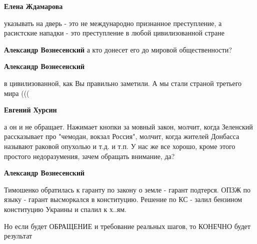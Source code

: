 \begin{itemize}
\begin{itemize}
 
\textbf{Елена Ждамарова} 

указывать на дверь - это не международно признанное преступление, а расистские
нападки - это преступление в любой цивилизованной стране


\textbf{Александр Вознесенский} а кто донесет его до мировой общественности?

 
\textbf{Александр Вознесенский} 

в цивилизованной, как Вы правильно заметили. А мы стали страной третьего мира (((

 
\textbf{Евгений Хурсин} 

а он и не обращает. Нажимает кнопки за мовный закон, молчит, когда Зеленский
рассказывает про "чемодан, вокзал Россия", молчит, когда жителей Донбасса
называют раковой опухолью и т.д. и т.п. У нас же все хорошо, кроме этого
простого недоразумения, зачем обращать внимание, да?


 
\textbf{Александр Вознесенский} 

Тимошенко обратилась к гаранту по закону о земле - гарант подтерся. ОПЗЖ по
языку - гарант высморкался в конституцию. Решение по КС - залил бензином
конституцию Украины и спалил к х..ям.

Но если будет ОБРАЩЕНИЕ и требование реальных шагов, то КОНЕЧНО будет результат

\end{itemize}



\end{itemize}

